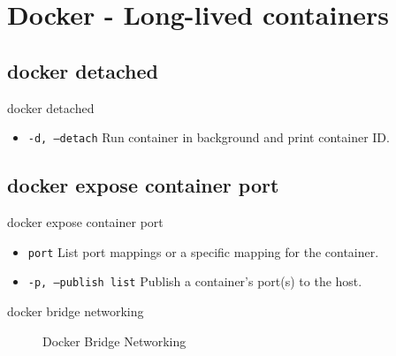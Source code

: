 
\section{Docker - Long-lived containers}\label{sec:docker-long-lived-containers}

\subsection{docker detached}\label{subsec:docker-detached}
\begin{frame}{docker detached}
    \begin{itemize}
        \item \texttt{-d, --detach} Run container in background and print container ID.
        
    \end{itemize}
\end{frame}

\subsection{docker expose container port}\label{subsec:docker-expose-container-port}
\begin{frame}{docker expose container port}
    \begin{itemize}
        \item \texttt{port} List port mappings or a specific mapping for the container.
        \item \texttt{-p, --publish list} Publish a container's port(s) to the host.
        
    \end{itemize}
\end{frame}
\begin{frame}{docker bridge networking}
    \begin{figure}[!t]
        \raggedright
        
        \caption{Docker Bridge Networking}
    \end{figure}
\end{frame}

